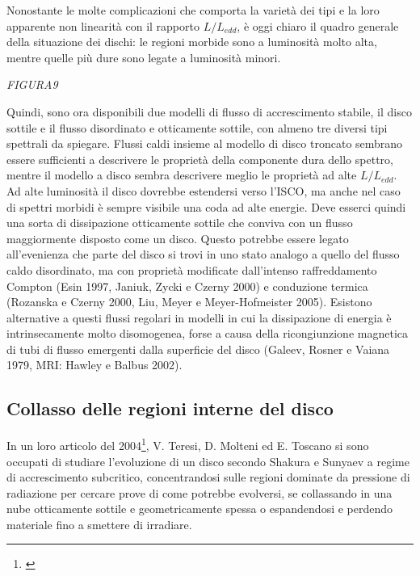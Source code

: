 \documentclass[a4paperbi]{article}
\begin{document}
	Nonostante le molte complicazioni che comporta la varietà dei tipi e la loro apparente non linearità con il rapporto $L/L_{edd}$, è oggi chiaro il quadro generale della situazione dei dischi: le regioni morbide sono a luminosità molto alta, mentre quelle più dure sono legate a luminosità minori.

	\emph{FIGURA9}	
	
	Quindi, sono ora disponibili due modelli di flusso di accrescimento stabile, il disco sottile e il flusso disordinato e otticamente sottile, con almeno tre diversi tipi spettrali da spiegare. Flussi caldi insieme al modello di disco troncato sembrano essere sufficienti a descrivere le proprietà della componente dura dello spettro, mentre il modello a disco sembra descrivere meglio le proprietà ad alte $L/L_{edd}$. Ad alte luminosità il disco dovrebbe estendersi verso l'ISCO, ma anche nel caso di spettri morbidi è sempre	visibile una coda ad alte energie. Deve esserci quindi una sorta di dissipazione otticamente sottile che conviva con un flusso maggiormente disposto come un disco. Questo potrebbe essere legato all'evenienza che parte del disco si trovi in uno stato analogo a quello del flusso caldo disordinato, ma con proprietà modificate dall'intenso raffreddamento Compton (Esin 1997, Janiuk, Zycki e Czerny 2000) e conduzione termica (Rozanska e Czerny 2000, Liu, Meyer e Meyer-Hofmeister 2005). Esistono alternative a questi flussi regolari in modelli in cui la dissipazione di energia è intrinsecamente molto disomogenea, forse a causa della ricongiunzione magnetica di tubi di flusso emergenti dalla superficie del disco (Galeev, Rosner e Vaiana 1979, MRI: Hawley e Balbus 2002).
 
	 \subsection{Collasso delle regioni interne del disco}
	
	In un loro articolo del 2004\footnote{\cite{TeresiMolteniToscano2004}}, V. Teresi, D. Molteni ed E. Toscano si sono occupati di studiare l'evoluzione di un disco secondo Shakura e Sunyaev a regime di accrescimento subcritico, concentrandosi sulle regioni dominate da pressione di radiazione per cercare prove di come potrebbe evolversi, se collassando in una nube otticamente sottile e geometricamente spessa o espandendosi e perdendo materiale fino a smettere di irradiare. 
	
\end{document}
